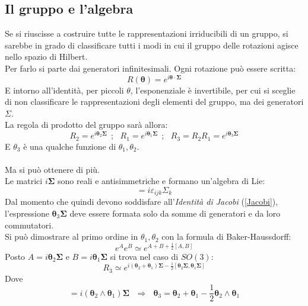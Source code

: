\documentclass[twoside]{article}
\begin{document}
\vspace{0.5cm}
\subsection{Il gruppo e l'algebra}
Se si riuscisse a costruire tutte le rappresentazioni irriducibili di un gruppo, si sarebbe in grado di classificare tutti i modi in cui il gruppo delle rotazioni agisce nello spazio di Hilbert.
\\
Per farlo si parte dai generatori infinitesimali. Ogni rotazione può essere scritta:
\begin{equation}
    R(\bm{\theta})=e^{i\bm{\theta}\cdot \bm{\Sigma}}
\end{equation}
E intorno all'identità, per piccoli $\theta$, l'esponenziale è invertibile, per cui si sceglie di non classificare le rappresentazioni degli elementi del gruppo, ma dei generatori $\Sigma$.
\\
La regola di prodotto del gruppo sarà allora:
\begin{equation}
    R_2=e^{i\bm{\theta}_2 \bm{\Sigma}} \ \ ; \ \ \ R_1=e^{i\bm{\theta}_1 \bm{\Sigma}} \ \ ; \ \ \ R_3=R_2R_1=e^{i\bm{\theta}_3\bm{\Sigma}}
\end{equation}
E $\theta_3$ è una qualche funzione di $\theta_1, \theta_2$.
\\
\\
Ma si può ottenere di più.
\\
Le matrici $i\bm{\Sigma}$ sono reali e antisimmetriche e formano un'algebra di Lie:
\begin{equation}
    [\Sigma_i,\Sigma_j]=i\varepsilon_{ijk}\Sigma_k
\end{equation}
Dal momento che quindi devono soddisfare all'\textit{Identità di Jacobi} (\ref{Jacobi}), l'espressione $\bm{\theta}_3\bm{\Sigma}$ deve essere formata solo da somme di generatori e da loro commutatori.
\\
Si può dimostrare al primo ordine in $\theta_1, \theta_2$ con la formula di Baker-Haussdorff:
\begin{equation}
    e^A e^B \simeq e^{A+B+\frac{1}{2}[A,B]}
\end{equation}
Posto $A=i\bm{\theta}_2 \bm{\Sigma}$ e $B=i\bm{\theta}_1 \bm{\Sigma}$ si trova nel caso di $SO(3)$:
\begin{equation}
    R_3\simeq e^{i(\bm{\theta}_2+\bm{\theta}_1)\bm{\Sigma}-\frac{1}{2}[\bm{\theta}_2\bm{\Sigma},\bm{\theta}_1\bm{\Sigma}]}
\end{equation}
Dove
\begin{equation}
    [\bm{\theta}_2\bm{\Sigma},\bm{\theta}_1\bm{\Sigma}]=i(\bm{\theta}_2 \wedge \bm{\theta}_1)\bm{\Sigma} \ \ \ \Rightarrow \ \ \ \bm{\theta}_3=\bm{\theta}_2 + \bm{\theta}_1 - \frac{1}{2}\bm{\theta}_2 \wedge \bm{\theta}_1
\end{equation}
\end{document}
